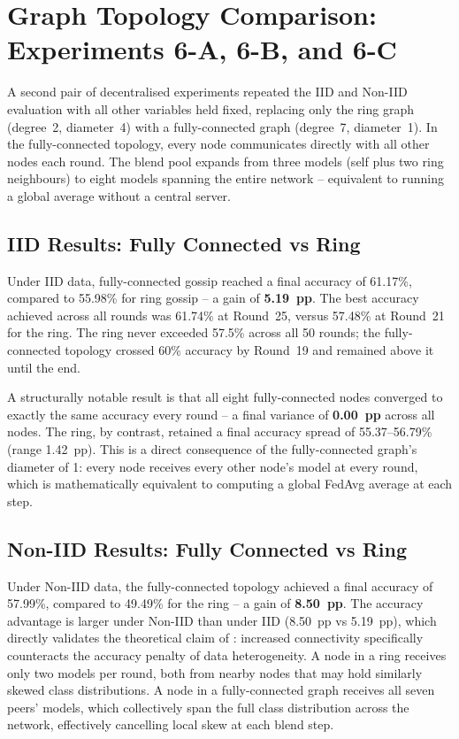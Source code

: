 \documentclass[12pt]{report}
\begin{document}
\section{Graph Topology Comparison: Experiments 6-A, 6-B, and 6-C}
\label{sec:topology-results}

A second pair of decentralised experiments repeated the IID and Non-IID
evaluation with all other variables held fixed, replacing only the ring graph
(degree~2, diameter~4) with a fully-connected graph (degree~7, diameter~1).
In the fully-connected topology, every node communicates directly with all
other nodes each round. The blend pool expands from three models (self plus
two ring neighbours) to eight models spanning the entire network -- equivalent
to running a global average without a central server.

\subsection{IID Results: Fully Connected vs Ring}

Under IID data, fully-connected gossip reached a final accuracy of 61.17\%,
compared to 55.98\% for ring gossip -- a gain of \textbf{5.19~pp}. The best
accuracy achieved across all rounds was 61.74\% at Round~25, versus 57.48\% at
Round~21 for the ring. The ring never exceeded 57.5\% across all 50 rounds;
the fully-connected topology crossed 60\% accuracy by Round~19 and remained
above it until the end.

A structurally notable result is that all eight fully-connected nodes converged
to exactly the same accuracy every round -- a final variance of \textbf{0.00~pp}
across all nodes. The ring, by contrast, retained a final accuracy spread of
55.37--56.79\% (range 1.42~pp). This is a direct consequence of the
fully-connected graph's diameter of 1: every node receives every other node's
model at every round, which is mathematically equivalent to computing a global
FedAvg average at each step.

\subsection{Non-IID Results: Fully Connected vs Ring}

Under Non-IID data, the fully-connected topology achieved a final accuracy of
57.99\%, compared to 49.49\% for the ring -- a gain of \textbf{8.50~pp}. The
accuracy advantage is larger under Non-IID than under IID (8.50~pp
vs 5.19~pp), which directly validates the theoretical claim of \citet{tang2018d2}:
increased connectivity specifically counteracts the accuracy penalty of data
heterogeneity. A node in a ring receives only two models per round, both from
nearby nodes that may hold similarly skewed class distributions. A node in a
fully-connected graph receives all seven peers' models, which collectively span
the full class distribution across the network, effectively cancelling local
skew at each blend step.
\end{document}
